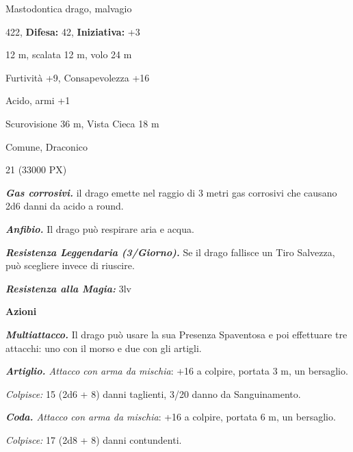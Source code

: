 \begin{multicols}{2}
{
\noindent
\begin{description}[noitemsep, topsep=0pt, parsep=0pt, partopsep=0pt, leftmargin=0cm, labelwidth=2.2cm]
	\item[\textbf{Taglia/Tipo:}] Mastodontica drago, malvagio
	\item[\textbf{Caratt.:}] 
	\item[\textbf{Punti Ferita:}] 422,  \textbf{Difesa:} 42,  \textbf{Iniziativa:} +3
	\item[\textbf{Movimento:}] 12 m, scalata 12 m, volo 24 m
	\item[\textbf{Tiri Salvez.:}] 
	\item[\textbf{Comp.:}] Furtività +9, Consapevolezza +16
	\item[\textbf{Imm. Danni:}] Acido, armi +1
	\item[\textbf{Sensi:}] Scurovisione 36 m, Vista Cieca 18 m
	\item[\textbf{Linguaggi:}] Comune, Draconico
	\item[\textbf{Sfida:}] 21 (33000 PX)\smallskip
\end{description}

\emph{\textbf{Gas corrosivi.}} il drago emette nel raggio di 3 metri gas corrosivi che causano 2d6 danni da acido a round.

\emph{\textbf{Anfibio.}} Il drago può respirare aria e acqua.

\emph{\textbf{Resistenza Leggendaria (3/Giorno).}} Se il drago fallisce un Tiro Salvezza, può scegliere invece di riuscire.

\emph{\textbf{Resistenza alla Magia:}} 3lv

\textbf{Azioni}

\emph{\textbf{Multiattacco.}} Il drago può usare la sua Presenza Spaventosa e poi effettuare tre attacchi: uno con il morso e due con gli artigli.

\emph{\textbf{Artiglio.} Attacco con arma da mischia}: +16 a colpire, portata 3 m, un bersaglio.

\emph{Colpisce:} 15 (2d6 + 8) danni taglienti, 3/20 danno da Sanguinamento.

\emph{\textbf{Coda.} Attacco con arma da mischia}: +16 a colpire, portata 6 m, un bersaglio.

\emph{Colpisce:} 17 (2d8 + 8) danni contundenti.

}
\end{multicols}
